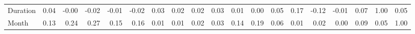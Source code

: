 \begin{tabular}{lrrrrrrrrrrrrrrrrrr}
Duration            &       0.04 &      -0.00 &     -0.02 &     -0.01 &     -0.02 &               0.03 &              0.02 &                 0.02 &                0.03 &         0.01 &         0.00 &     0.05 &           0.17 &   -0.12 &     -0.01 &    0.07 &      1.00 &   0.05 \\
Month               &       0.13 &       0.24 &      0.27 &      0.15 &      0.16 &               0.01 &              0.01 &                 0.02 &                0.03 &         0.14 &         0.19 &     0.06 &           0.01 &    0.02 &      0.00 &    0.09 &      0.05 &   1.00 \\
\bottomrule
\end{tabular}
